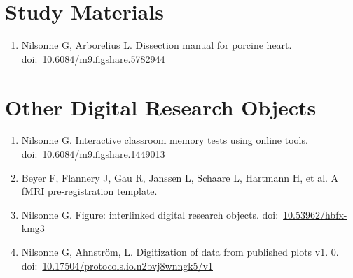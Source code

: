 \documentclass[10pt,a4paper,twocolumn]{article}
\begin{document}

\section{Study Materials}
\begin{enumerate}

    \item Nilsonne G, Arborelius L. Dissection manual for porcine heart. doi:~\href{https://doi.org/10.6084/m9.figshare.5782944}{10.6084/m9.figshare.5782944}

\end{enumerate}



\section{Other Digital Research Objects}
\begin{enumerate}

    \item Nilsonne G. Interactive classroom memory tests using online tools. doi:~\href{https://doi.org/10.6084/m9.figshare.1449013}{10.6084/m9.figshare.1449013}

    \item Beyer F, Flannery J, Gau R, Janssen L, Schaare L, Hartmann H, et al. A fMRI pre-registration template.

    \item Nilsonne G. Figure: interlinked digital research objects. doi:~\href{https://doi.org/10.53962/hbfx-kmg3}{10.53962/hbfx-kmg3}

    \item Nilsonne G, Ahnström, L. Digitization of data from published plots v1. 0. doi:~\href{https://doi.org/10.17504/protocols.io.n2bvj8wnngk5/v1}{10.17504/protocols.io.n2bvj8wnngk5/v1}

\end{enumerate}


\end{document}
